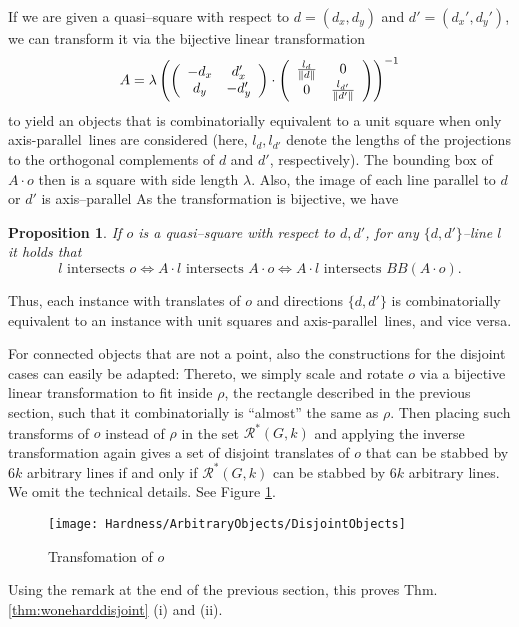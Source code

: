 \documentclass[12pt]{article}
\newtheorem{proposition}[definition]{Proposition}
\newcommand{\ap}{a.p.\ }
\renewcommand{\ap}{axis-parallel\ }
\newcommand{\calR}{\mathcal{R}}
\begin{document}
If we are given a quasi--square with respect to $d = (d_x, d_y)$ and $d' = (d_x', d_y')$, we can transform it via the bijective linear transformation
\[ A = \lambda
\left( 
\left(
\begin{array}[h]{cc}
-d_x & d_x'\\
d_y & -d_y'
\end{array}
\right) \cdot
\left(
\begin{array}[h]{cc}
	\frac{l_d}{\| d \|} & 0\\
	0 & \frac{l_{d'}}{\| d' \|}
\end{array}
\right)
\right)^{-1}
\]
to yield an objects that is combinatorially equivalent to a unit square when only \ap lines are considered (here, $l_{d}, l_{d'}$ denote the lengths of the projections to the orthogonal complements of $d$ and $d'$, respectively).
The bounding box of $A\cdot o$ then is a square with side length $\lambda$. Also, the image of each line parallel to $d$ or $d'$ is axis--parallel As the transformation is bijective, we have 
\begin{proposition}\label{Proposition:BoundingBox} If $o$ is a quasi--square with respect to $d, d'$, for any  $\{d, d'\}$--line $l$ it holds that
\[ l\text{ intersects } o \iff A\cdot l\text{ intersects } A\cdot o \iff A\cdot l \text{ intersects } BB(A \cdot o). \] 
\end{proposition}
Thus, each instance with translates of $o$ and directions $\{d, d'\}$ is combinatorially equivalent to an instance with unit squares and \ap lines, and vice versa.

For connected objects that are not a point, also the constructions for the disjoint cases can easily be adapted: Thereto, we simply scale and rotate $o$ via a bijective linear transformation to fit inside $\rho$, the rectangle described in the previous section, such that it combinatorially is ``almost'' the same as $\rho$. Then placing such transforms of $o$ instead of $\rho$ in the set $\calR^*(G, k)$ and applying the inverse transformation again gives a set of disjoint translates of $o$ that can be stabbed by $6k$ arbitrary lines if and only if $\calR^*(G, k)$ can be stabbed by $6k$ arbitrary lines. We omit the technical details. See Figure \ref{fig:DisjointObjects}.
\begin{figure}[htbp]
	\centering
		\texttt{[image: Hardness/ArbitraryObjects/DisjointObjects]}
		\caption{Transfomation of $o$}
	\label{fig:DisjointObjects}
\end{figure}
Using the remark at the end of the previous section, this proves Thm. \ref{thm:woneharddisjoint} (i) and (ii).
\end{document}
